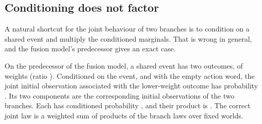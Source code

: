 \subsection{Conditioning does not factor}

A natural shortcut for the joint behaviour of two branches is to condition on
a shared event and multiply the conditioned marginals. That is wrong in
general, and the fusion model's predecessor gives an exact case.

\begin{proposition}
\label{prop:conditioning}
On the predecessor of the fusion model, a shared event has two outcomes, of
weights \snapGTwoSixConditioningEventWeights{} (ratio
\snapGTwoSixConditioningRelativeWeights{}). Conditioned on the event, and with the empty action word, the joint initial
observation associated with the lower-weight outcome has probability
\snapGTwoSixConditionedJointMass{}. Its two components are the corresponding
initial observations of the two branches. Each has conditioned probability
\snapGTwoSixConditionedLeftMass{}, and their product is
\snapGTwoSixProductOfConditionedMarginals{}. The correct joint
law is a weighted sum of products of the branch laws over fixed worlds.
\end{proposition}
